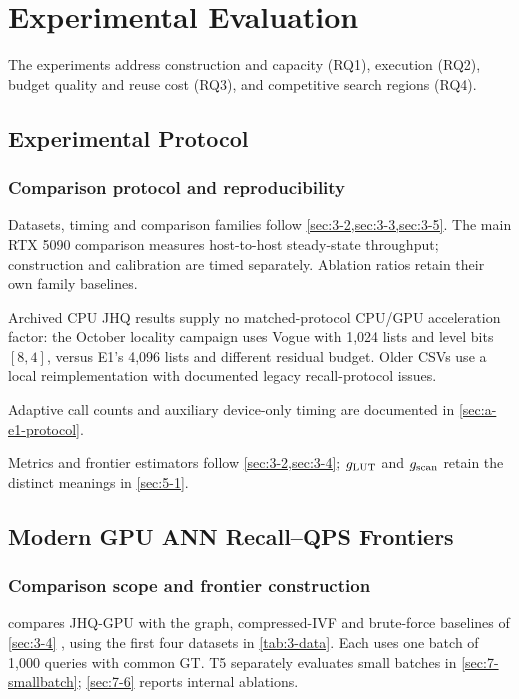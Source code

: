 \chapter{Experimental Evaluation}
\label{ch:evaluation}

The experiments address construction and capacity (RQ1), execution (RQ2),
budget quality and reuse cost (RQ3), and competitive search regions (RQ4).

\section{Experimental Protocol}
\label{sec:7-1}

\subsection{Comparison protocol and reproducibility}

Datasets, timing and comparison families follow
\cref{sec:3-2,sec:3-3,sec:3-5}. The main RTX 5090 comparison measures
host-to-host steady-state throughput; construction and calibration are
timed separately. Ablation ratios retain their own family baselines.

Archived CPU JHQ results supply no matched-protocol CPU/GPU acceleration
factor: the October locality campaign uses Vogue with 1,024 lists and
level bits $[8,4]$, versus E1's 4,096 lists and different residual budget.
Older CSVs use a local reimplementation with documented legacy
recall-protocol issues.

Adaptive call counts and auxiliary device-only timing are documented in
\cref{sec:a-e1-protocol}.

Metrics and frontier estimators follow \cref{sec:3-2,sec:3-4};
$g_{\mathrm{LUT}}$ and $g_{\mathrm{scan}}$ retain the distinct meanings in \cref{sec:5-1}.





\section{Modern GPU ANN Recall--QPS Frontiers}
\label{sec:7-2}

\subsection{Comparison scope and frontier construction}

 compares JHQ-GPU with the graph, compressed-IVF
and brute-force baselines of \cref{sec:3-4} \cite{cagra,pq,ivfrabitq},
using the first four datasets in \cref{tab:3-data}. Each uses one batch
of 1,000 queries with common GT. T5 separately evaluates small batches
in \cref{sec:7-smallbatch}; \cref{sec:7-6} reports internal ablations.



